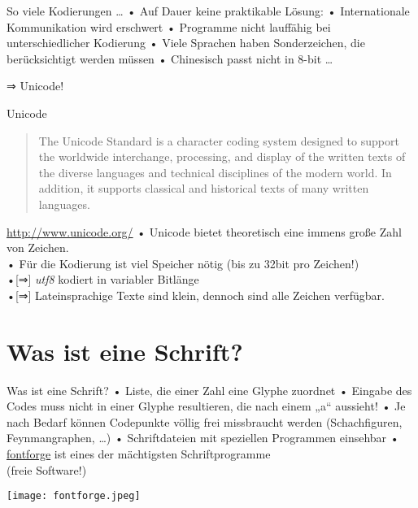 \begin{frame}{So viele Kodierungen …}
• Auf Dauer keine praktikable Lösung:
• Internationale Kommunikation wird erschwert
• Programme nicht lauffähig bei unterschiedlicher Kodierung
• Viele Sprachen haben Sonderzeichen, die berücksichtigt werden müssen
• Chinesisch passt nicht in 8-bit …
\•
\pause
\centerline{\Large ⇒ Unicode!}
\end{frame}

\begin{frame}{Unicode}
\begin{quotation}
The Unicode Standard is a character coding system designed to support the worldwide interchange, processing, and display of the written texts of the diverse languages and technical disciplines of the modern world. In addition, it supports classical and historical texts of many written languages.\\
\end{quotation}
\url{http://www.unicode.org/}
\pause 
• Unicode bietet theoretisch eine immens große Zahl von Zeichen.\\
• Für die Kodierung ist viel Speicher nötig (bis zu 32bit pro Zeichen!)\\
•[⇒] \emph{utf8} kodiert in variabler Bitlänge\\
•[⇒] Lateinsprachige Texte sind klein, dennoch sind alle Zeichen verfügbar.
\•
\end{frame}


\section{Was ist eine Schrift?}
\begin{frame}[fragile]{Was ist eine Schrift?}
• Liste, die einer Zahl eine Glyphe zuordnet
• Eingabe des Codes  muss nicht in einer Glyphe resultieren, die nach einem „a“ aussieht!
• Je nach Bedarf können Codepunkte völlig frei missbraucht werden
(Schachfiguren, Feynmangraphen, …)
• Schriftdateien mit speziellen Programmen einsehbar
• \hyperlink{http://fontforge.sourceforge.net/}{fontforge} ist eines der mächtigsten Schriftprogramme\\ (freie Software!)
\• 
\centerline{\texttt{[image: fontforge.jpeg]}}
\einschub[fontforge]
\end{frame}

